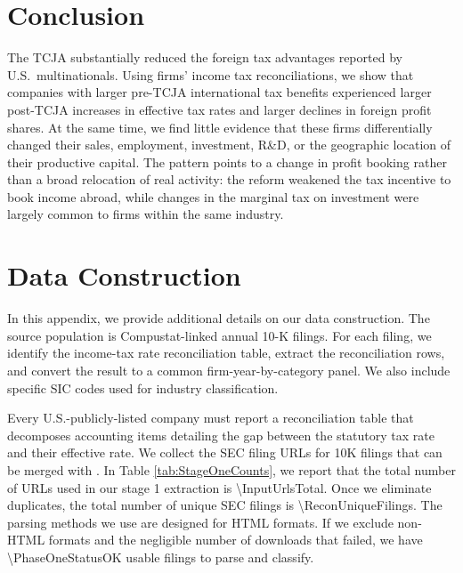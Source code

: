 \documentclass[11pt,letterpaper]{article}
\newcommand{\CountNum}[1]{\num[round-mode=places,round-precision=0]{#1}}
\begin{document}
\section{Conclusion}

The TCJA substantially reduced the foreign tax advantages reported by U.S.~multinationals. 
Using firms' income tax reconciliations, we show that companies
with larger pre-TCJA international tax benefits experienced larger post-TCJA
increases in effective tax rates and larger declines in foreign profit shares.
At the same time, we find little evidence that these firms differentially changed
their sales, employment, investment, R\&D, or the geographic location of their
productive capital. The pattern points to a change in profit booking rather than
a broad relocation of real activity: the reform weakened the tax incentive to
book income abroad, while changes in the marginal tax on investment were largely
common to firms within the same industry.


\newpage






\newpage

\appendix


\section{Data Construction}

In this appendix, we provide additional details on our
data construction.
The source population is Compustat-linked annual 10-K
filings. For each filing, we identify the income-tax rate reconciliation table,
extract the reconciliation rows, and convert the result to a common
firm-year-by-category panel.
We also include specific SIC codes used for industry classification.

Every U.S.-publicly-listed company must report a reconciliation table 
that decomposes accounting items detailing the gap between the statutory 
tax rate and their effective rate. We collect the SEC filing URLs for 
10K filings that can be merged with \citet{CompustatAnnual}. In Table
\ref{tab:StageOneCounts}, we report that the total number of URLs used in our
stage 1 extraction is  \CountNum{\InputUrlsTotal}.  Once we eliminate duplicates,
the total number of unique SEC filings is \CountNum{\ReconUniqueFilings}.
The parsing methods we use are designed for HTML formats. If we exclude
non-HTML formats and the negligible number of downloads that failed, we have
\CountNum{\PhaseOneStatusOK} usable filings to parse  and classify.
\end{document}
